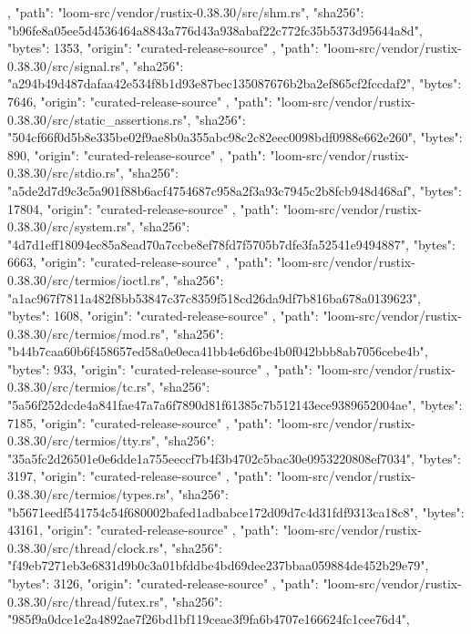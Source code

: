 {{    },
    {
      "path": "loom-src/vendor/rustix-0.38.30/src/shm.rs",
      "sha256": "b96fe8a05ee5d4536464a8843a776d43a938abaf22c772fc35b5373d95644a8d",
      "bytes": 1353,
      "origin": "curated-release-source"
    },
    {
      "path": "loom-src/vendor/rustix-0.38.30/src/signal.rs",
      "sha256": "a294b49d487dafaa42e534f8b1d93e87bec135087676b2ba2ef865cf2fccdaf2",
      "bytes": 7646,
      "origin": "curated-release-source"
    },
    {
      "path": "loom-src/vendor/rustix-0.38.30/src/static_assertions.rs",
      "sha256": "504cf66f0d5b8e335be02f9ae8b0a355abc98c2c82eec0098bdf0988e662e260",
      "bytes": 890,
      "origin": "curated-release-source"
    },
    {
      "path": "loom-src/vendor/rustix-0.38.30/src/stdio.rs",
      "sha256": "a5de2d7d9c3c5a901f88b6acf4754687c958a2f3a93c7945c2b8fcb948d468af",
      "bytes": 17804,
      "origin": "curated-release-source"
    },
    {
      "path": "loom-src/vendor/rustix-0.38.30/src/system.rs",
      "sha256": "4d7d1eff18094ec85a8ead70a7ccbe8ef78fd7f5705b7dfe3fa52541e9494887",
      "bytes": 6663,
      "origin": "curated-release-source"
    },
    {
      "path": "loom-src/vendor/rustix-0.38.30/src/termios/ioctl.rs",
      "sha256": "a1ac967f7811a482f8bb53847c37c8359f518cd26da9df7b816ba678a0139623",
      "bytes": 1608,
      "origin": "curated-release-source"
    },
    {
      "path": "loom-src/vendor/rustix-0.38.30/src/termios/mod.rs",
      "sha256": "b44b7caa60b6f458657ed58a0e0eca41bb4e6d6be4b0f042bbb8ab7056cebe4b",
      "bytes": 933,
      "origin": "curated-release-source"
    },
    {
      "path": "loom-src/vendor/rustix-0.38.30/src/termios/tc.rs",
      "sha256": "5a56f252dcde4a841fae47a7a6f7890d81f61385c7b512143ece9389652004ae",
      "bytes": 7185,
      "origin": "curated-release-source"
    },
    {
      "path": "loom-src/vendor/rustix-0.38.30/src/termios/tty.rs",
      "sha256": "35a5fc2d26501e0e6dde1a755eeccf7b4f3b4702c5bac30e0953220808ef7034",
      "bytes": 3197,
      "origin": "curated-release-source"
    },
    {
      "path": "loom-src/vendor/rustix-0.38.30/src/termios/types.rs",
      "sha256": "b5671eedf541754c54f680002bafed1adbabce172d09d7c4d31fdf9313ca18c8",
      "bytes": 43161,
      "origin": "curated-release-source"
    },
    {
      "path": "loom-src/vendor/rustix-0.38.30/src/thread/clock.rs",
      "sha256": "f49eb7271eb3e6831d9b0c3a01bfddbe4bd69dee237bbaa059884de452b29e79",
      "bytes": 3126,
      "origin": "curated-release-source"
    },
    {
      "path": "loom-src/vendor/rustix-0.38.30/src/thread/futex.rs",
      "sha256": "985f9a0dce1e2a4892ae7f26bd1bf119ceae3f9fa6b4707e166624fc1cee76d4",
}}
